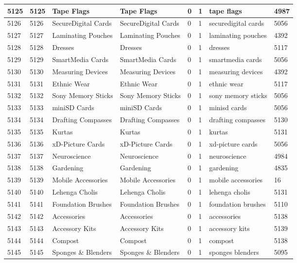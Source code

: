 \begin{longtable}{|l|l|l|l|l|l|l|l|}
5125 & 5125 & Tape Flags & Tape Flags & 0 & 1 & tape flags & 4987 \\ \hline 
5126 & 5126 & SecureDigital Cards & SecureDigital Cards & 0 & 1 & securedigital cards & 5056 \\ \hline 
5127 & 5127 & Laminating Pouches & Laminating Pouches & 0 & 1 & laminating pouches & 4392 \\ \hline 
5128 & 5128 & Dresses & Dresses & 0 & 1 & dresses & 5117 \\ \hline 
5129 & 5129 & SmartMedia Cards & SmartMedia Cards & 0 & 1 & smartmedia cards & 5056 \\ \hline 
5130 & 5130 & Measuring Devices & Measuring Devices & 0 & 1 & measuring devices & 4392 \\ \hline 
5131 & 5131 & Ethnic Wear & Ethnic Wear & 0 & 1 & ethnic wear & 5117 \\ \hline 
5132 & 5132 & Sony Memory Sticks & Sony Memory Sticks & 0 & 1 & sony memory sticks & 5056 \\ \hline 
5133 & 5133 & miniSD Cards & miniSD Cards & 0 & 1 & minisd cards & 5056 \\ \hline 
5134 & 5134 & Drafting Compasses & Drafting Compasses & 0 & 1 & drafting compasses & 5130 \\ \hline 
5135 & 5135 & Kurtas & Kurtas & 0 & 1 & kurtas & 5131 \\ \hline 
5136 & 5136 & xD-Picture Cards & xD-Picture Cards & 0 & 1 & xd-picture cards & 5056 \\ \hline 
5137 & 5137 & Neuroscience & Neuroscience & 0 & 1 & neuroscience & 4984 \\ \hline 
5138 & 5138 & Gardening & Gardening & 0 & 1 & gardening & 4835 \\ \hline 
5139 & 5139 & Mobile Accessories & Mobile Accessories & 0 & 1 & mobile accessories & 16 \\ \hline 
5140 & 5140 & Lehenga Cholis & Lehenga Cholis & 0 & 1 & lehenga cholis & 5131 \\ \hline 
5141 & 5141 & Foundation Brushes & Foundation Brushes & 0 & 1 & foundation brushes & 5110 \\ \hline 
5142 & 5142 & Accessories & Accessories & 0 & 1 & accessories & 5138 \\ \hline 
5143 & 5143 & Accessory Kits & Accessory Kits & 0 & 1 & accessory kits & 5139 \\ \hline 
5144 & 5144 & Compost & Compost & 0 & 1 & compost & 5138 \\ \hline 
5145 & 5145 & Sponges \& Blenders & Sponges \& Blenders & 0 & 1 & sponges blenders & 5095 \\ \hline 

\end{longtable}

